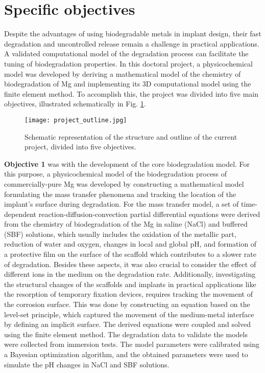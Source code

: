 \section{Specific objectives} \label{sec:aim_objective}

Despite the advantages of using biodegradable metals in implant design, their fast degradation and uncontrolled release remain a challenge in practical applications. A validated computational model of the degradation process can facilitate the tuning of biodegradation properties. In this doctoral project, a physicochemical model was developed by deriving a mathematical model of the chemistry of biodegradation of Mg and implementing its 3D computational model using the finite element method. To accomplish this, the project was divided into five main objectives, illustrated schematically in Fig. \ref{fig:objective_project_outline}.

\begin{figure}
\centering
\medskip
\texttt{[image: project\_outline.jpg]}
\caption[Schematic of the project outline]{Schematic representation of the structure and outline of the current project, divided into five objectives.} \label{fig:objective_project_outline}
\end{figure}

\textbf{Objective 1} was with the development of the core biodegradation model. For this purpose, a physicochemical model of the biodegradation process of commercially-pure Mg was developed by constructing a mathematical model formulating the mass transfer phenomena and tracking the location of the implant's surface during degradation. For the mass transfer model, a set of time-dependent reaction-diffusion-convection partial differential equations were derived from the chemistry of biodegradation of the Mg in saline (NaCl) and buffered ({SBF}) solutions, which usually includes the oxidation of the metallic part, reduction of water and oxygen, changes in local and global pH, and formation of a protective film on the surface of the scaffold which contributes to a slower rate of degradation. Besides these aspects, it was also crucial to consider the effect of different ions in the medium on the degradation rate. Additionally, investigating the structural changes of the scaffolds and implants in practical applications like the resorption of temporary fixation devices, requires tracking the movement of the corrosion surface. This was done by constructing an equation based on the level-set principle, which captured the movement of the medium-metal interface by defining an implicit surface. The derived equations were coupled and solved using the finite element method. The degradation data to validate the models were collected from immersion tests. The model parameters were calibrated using a Bayesian optimization algorithm, and the obtained parameters were used to simulate the pH changes in NaCl and {SBF} solutions.

